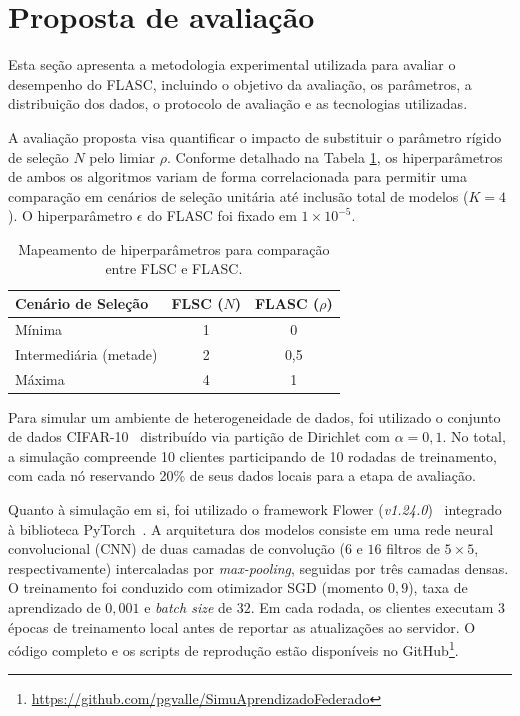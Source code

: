 \section{Proposta de avaliação} \label{sec:experiment}

Esta seção apresenta a metodologia experimental utilizada para avaliar o desempenho do FLASC,
incluindo o objetivo da avaliação, os parâmetros, a distribuição dos dados,
o protocolo de avaliação e as tecnologias utilizadas.

A avaliação proposta visa quantificar o impacto de substituir o parâmetro rígido de seleção $N$ pelo limiar $\rho$.
Conforme detalhado na Tabela \ref{tab:configs},
os hiperparâmetros de ambos os algoritmos variam de forma correlacionada para permitir uma comparação
em cenários de seleção unitária até inclusão total de modelos ($K=4$).
O hiperparâmetro $\epsilon$ do FLASC foi fixado em $1 \times 10^{-5}$.

\begin{table}[H]
\centering
\caption{Mapeamento de hiperparâmetros para comparação entre FLSC e FLASC.}
\label{tab:configs}
\begin{tabular}{lcc}
\hline
\textbf{Cenário de Seleção} & \textbf{FLSC ($N$)} & \textbf{FLASC ($\rho$)} \\ \hline
Mínima                      & 1                   & 0                       \\
Intermediária (metade)      & 2                   & 0,5                     \\
Máxima                      & 4                   & 1                       \\ \hline
\end{tabular}
\end{table}

Para simular um ambiente de heterogeneidade de dados,
foi utilizado o conjunto de dados CIFAR-10~\cite{cifar10} distribuído via partição de Dirichlet com $\alpha = 0,1$.
No total, a simulação compreende 10 clientes participando de 10 rodadas de treinamento,
com cada nó reservando 20\% de seus dados locais para a etapa de avaliação.

Quanto à simulação em si, foi utilizado o framework Flower (\textit{v1.24.0})~\cite{flower} integrado à biblioteca PyTorch~\cite{pytorch}.
A arquitetura dos modelos consiste em uma rede neural convolucional (CNN) de duas camadas de convolução
($6$ e $16$ filtros de $5 \times 5$, respectivamente) intercaladas por \textit{max-pooling}, seguidas por três camadas densas.
O treinamento foi conduzido com otimizador SGD (momento $0,9$), taxa de aprendizado de $0,001$ e \textit{batch size} de $32$.
Em cada rodada, os clientes executam $3$ épocas de treinamento local antes de reportar as atualizações ao servidor.
O código completo e os scripts de reprodução estão disponíveis no GitHub\footnote{\url{https://github.com/pgvalle/SimuAprendizadoFederado}}.

